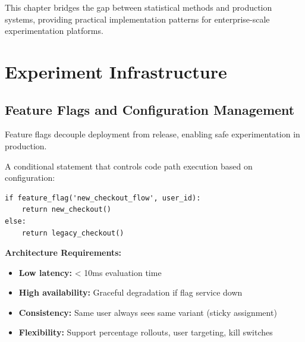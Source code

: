 This chapter bridges the gap between statistical methods and production systems, providing practical implementation patterns for enterprise-scale experimentation platforms.

\section{Experiment Infrastructure}

\subsection{Feature Flags and Configuration Management}

Feature flags decouple deployment from release, enabling safe experimentation in production.

\begin{definition}
A conditional statement that controls code path execution based on configuration:
\begin{verbatim}
if feature_flag('new_checkout_flow', user_id):
    return new_checkout()
else:
    return legacy_checkout()
\end{verbatim}
\end{definition}

\textbf{Architecture Requirements:}
\begin{itemize}
    \item \textbf{Low latency:} < 10ms evaluation time
    \item \textbf{High availability:} Graceful degradation if flag service down
    \item \textbf{Consistency:} Same user always sees same variant (sticky assignment)
    \item \textbf{Flexibility:} Support percentage rollouts, user targeting, kill switches
\end{itemize}

